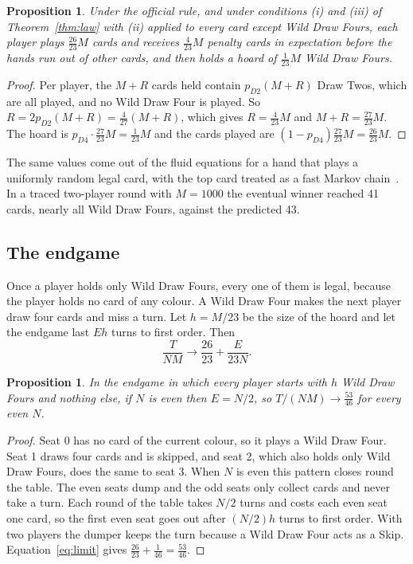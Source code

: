 \documentclass[11pt]{amsart}
\newtheorem{proposition}[theorem]{Proposition}
\theoremstyle{remark}
\begin{document}
\begin{proposition}\label{prop:hoard}
Under the official rule, and under conditions (i) and (iii) of Theorem~\ref{thm:law} with (ii) applied to every card except Wild Draw Fours, each player plays $\frac{26}{23}M$ cards and receives $\frac{4}{23}M$ penalty cards in expectation before the hands run out of other cards, and then holds a hoard of $\frac{1}{23}M$ Wild Draw Fours.
\end{proposition}

\begin{proof}
Per player, the $M+R$ cards held contain $p_{D2}(M+R)$ Draw Twos, which are all played, and no Wild Draw Four is played. So $R = 2p_{D2}(M+R) = \frac{4}{27}(M+R)$, which gives $R=\frac{4}{23}M$ and $M+R=\frac{27}{23}M$. The hoard is $p_{D4}\cdot\frac{27}{23}M = \frac{1}{23}M$ and the cards played are $(1-p_{D4})\frac{27}{23}M = \frac{26}{23}M$.
\end{proof}

The same values come out of the fluid equations for a hand that plays a uniformly random legal card, with the top card treated as a fast Markov chain~\cite{repo}. In a traced two-player round with $M=1000$ the eventual winner reached 41 cards, nearly all Wild Draw Fours, against the predicted 43.

\subsection{The endgame}

Once a player holds only Wild Draw Fours, every one of them is legal, because the player holds no card of any colour. A Wild Draw Four makes the next player draw four cards and miss a turn. Let $h=M/23$ be the size of the hoard and let the endgame last $E h$ turns to first order. Then
\begin{equation}\label{eq:limit}
\frac{T}{NM} \to \frac{26}{23} + \frac{E}{23N}.
\end{equation}

\begin{proposition}\label{prop:even}
In the endgame in which every player starts with $h$ Wild Draw Fours and nothing else, if $N$ is even then $E=N/2$, so $T/(NM)\to\frac{53}{46}$ for every even $N$.
\end{proposition}

\begin{proof}
Seat 0 has no card of the current colour, so it plays a Wild Draw Four. Seat 1 draws four cards and is skipped, and seat 2, which also holds only Wild Draw Fours, does the same to seat 3. When $N$ is even this pattern closes round the table. The even seats dump and the odd seats only collect cards and never take a turn. Each round of the table takes $N/2$ turns and costs each even seat one card, so the first even seat goes out after $(N/2)h$ turns to first order. With two players the dumper keeps the turn because a Wild Draw Four acts as a Skip. Equation~\eqref{eq:limit} gives $\frac{26}{23}+\frac{1}{46}=\frac{53}{46}$.
\end{proof}
\end{document}
